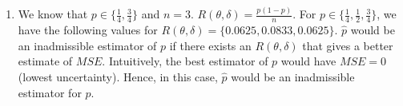 \begin{enumerate}
		\item
			We know that $p \in \{ \frac{1}{4}, \frac{3}{4} \}$ and $n = 3$. $R(\theta, \delta) = \frac{p(1 - p)}{n}$. For $p \in \{ \frac{1}{4}, \frac{1}{2}, \frac{3}{4} \}$, we have the following values for $R(\theta, \delta) = \{ 0.0625, 0.0833, 0.0625 \}$. $\hat{p}$ would be an inadmissible estimator of $p$ if there exists an $R(\theta, \delta)$ that gives a better estimate of $MSE$. Intuitively, the best estimator of $p$ would have $MSE = 0$ (lowest uncertainty). Hence, in this case, $\hat{p}$ would be an inadmissible estimator for $p$.
			
	\end{enumerate}
